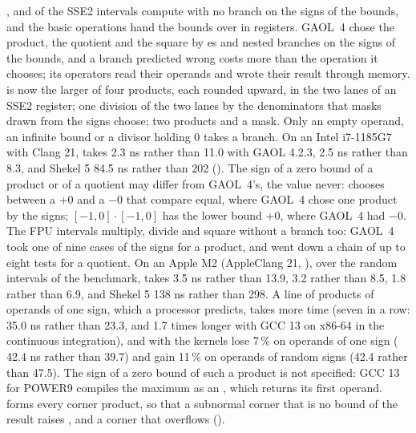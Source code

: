 \medskip
\code{*}, \code{/} and  of the SSE2 intervals compute with no
branch on the signs of the bounds, and the basic operations hand the bounds
over in registers.\newinvfive{} GAOL~4 chose the product, the quotient and
the square by es and nested branches on the signs of the bounds,
and a branch predicted wrong costs more than the operation it chooses; its
operators read their operands and wrote their result through memory.
 is now the larger of four products, each rounded upward, in the
two lanes of an SSE2 register;  one division of the two lanes by
the denominators that masks drawn from the signs choose;  two
products and a mask. Only an empty operand, an infinite bound or a divisor
holding 0 takes a branch. On an Intel i7-1185G7 with Clang 21, 
takes 2.3 ns rather than 11.0 with GAOL 4.2.3,  2.5 ns rather than 8.3, and Shekel 5 84.5 ns rather than 202 (). The
sign of a zero bound of a product or of a quotient may differ from GAOL~4's,
the value never:  chooses between a $+0$ and a $-0$ that compare
equal, where GAOL~4 chose one product by the signs; $[-1, 0] \cdot [-1, 0]$
has the lower bound $+0$, where GAOL~4 had $-0$. The FPU intervals multiply,
divide and square without a branch too: GAOL~4 took one of nine cases of the
signs for a product, and went down a chain of up to eight tests for a
quotient. On an Apple M2 (AppleClang 21, ), over the
random intervals of the benchmark,  takes 3.5 ns rather than
13.9,  3.2 rather than 8.5,  1.8 rather than 6.9,
and Shekel 5 138 ns rather than 298. A line of products of operands of one
sign, which a processor predicts, takes more time (seven \code{*} in a row:
35.0 ns rather than 23.3, and 1.7 times longer with GCC 13 on x86-64 in the
continuous integration), and with  the kernels
lose 7\,\% on operands of one sign ( 42.4 ns rather than 39.7) and
gain 11\,\% on operands of random signs (42.4 rather than 47.5). The sign of a zero
bound of such a product is not specified: GCC 13 for POWER9 compiles the
maximum as an , which returns its first operand. 
forms every corner product, so that a subnormal corner that is no bound of
the result raises , and a corner that overflows
 ().

